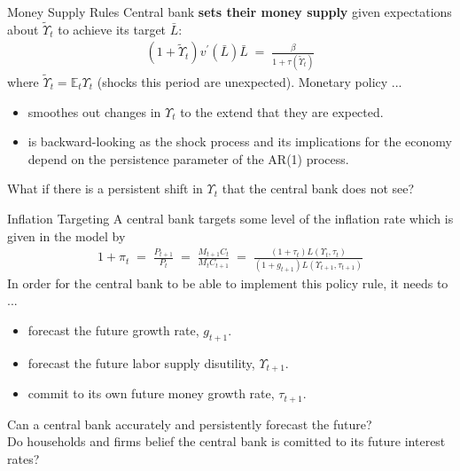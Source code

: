 \documentclass[10pt,c,aspectratio=1610,handout]{beamer}
\begin{document}
\begin{frame}{Money Supply Rules}%
  Central bank \textbf{sets their money supply} given  expectations about $\tilde{\Upsilon}_t$ to achieve its target $\bar{L}$:%
  \begin{align}%
    \left( 1+ \tilde{\Upsilon}_t\right) v^{\prime}\left(\bar{L}\right) \bar{L} \; = \; \frac{\beta}{1+\tau\left(\tilde{\Upsilon}_t\right)}
  \end{align}%
  where $\tilde{\Upsilon}_t = \mathbb{E}_t \Upsilon_t$ {\small(shocks this period are unexpected)}. Monetary policy ...%
  \pause%
  \begin{itemize}%
    \item[$\blacktriangleright$] smoothes out changes in $\Upsilon_t$ to the extend that they are expected.%
    \item[$\blacktriangleright$] is backward-looking as the shock process and its implications for the economy depend on the persistence parameter of the AR(1) process.%
  \end{itemize}%
  \vspace{0.1in}%
  \pause%
  \begin{center}%
    What if there is a persistent shift in $\Upsilon_t$ that the central bank does not see?%
  \end{center}%
\end{frame}%
\begin{frame}{Inflation Targeting}%
  A central bank targets some level of the inflation rate which is given in the model by%
  \begin{align}%
    1+\pi_t \; = \; \frac{P_{t+1}}{P_t} \; = \; \frac{M_{t+1} C_{t}}{M_t C_{t+1}} \; = \; \frac{\left(1+\tau_t\right) L\left(\Upsilon_t, \tau_t\right)}{\left(1+g_{t+1}\right) L\left(\Upsilon_{t+1}, \tau_{t+1}\right)}
  \end{align}%
  \pause%
  In order for the central bank to be able to implement this policy rule, it needs to ...%
  \begin{itemize}%
    \item[$\blacktriangleright$] forecast the future growth rate, $g_{t+1}$.%
    \item[$\blacktriangleright$] forecast the future labor supply disutility, $\Upsilon_{t+1}$.%
    \item[$\blacktriangleright$] commit to its own future money growth rate, $\tau_{t+1}$.%
  \end{itemize}%
  \vspace{0.1in}%
  \pause%
  \begin{center}%
    Can a central bank accurately and persistently forecast the future?\\%
    Do households and firms belief the central bank is comitted to its future interest rates?%
  \end{center}%
\end{frame}%
\end{document}
